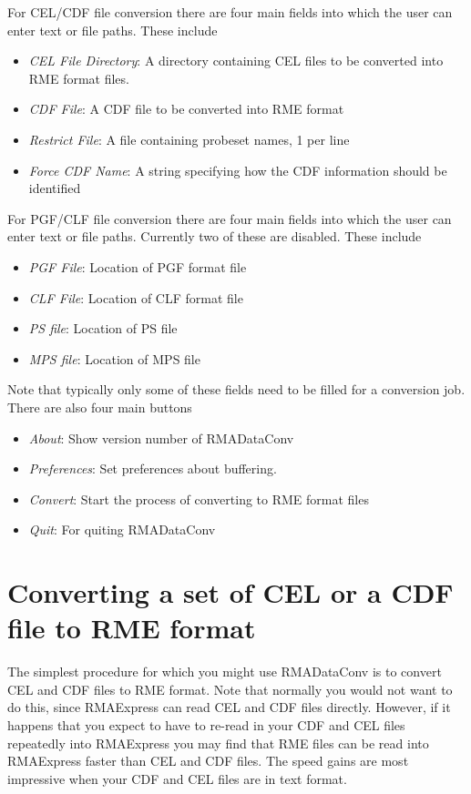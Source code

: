 \documentclass[11pt]{report}
\begin{document}
For CEL/CDF file conversion there are four main fields into which the user can enter text or file paths. These include
\begin{itemize}
\item {\it CEL File Directory}: A directory containing CEL files to be converted into RME format files.
\item {\it CDF File}: A CDF file to be converted into RME format
\item {\it Restrict File}: A file containing probeset names, 1 per line
\item {\it Force CDF Name}: A string specifying how the CDF information should be identified 
\end{itemize}

For PGF/CLF file conversion there are four main fields into which the user can enter text or file paths. Currently two of these are disabled. These include
\begin{itemize}
\item {\it PGF File}: Location of PGF format file
\item {\it CLF File}: Location of CLF format file
\item {\it PS file}: Location of PS file
\item {\it MPS file}: Location of MPS file
\end{itemize}


Note that typically only some of these fields need to be filled for a conversion job. There are also four main buttons
\begin{itemize}
\item {\it About}: Show version number of RMADataConv
\item {\it Preferences}: Set preferences about buffering.
\item {\it Convert}: Start the process of converting to RME format files
\item {\it Quit}: For quiting RMADataConv
\end{itemize}

\section{Converting a set of CEL or a CDF file to RME format}

The simplest procedure for which you might use RMADataConv is to convert CEL and CDF files to RME format. Note that normally you would not want to do this, since RMAExpress can read CEL and CDF files directly. However, if it happens that you expect to have to re-read in your CDF and CEL files repeatedly into RMAExpress you may find that RME files can be read into RMAExpress faster than CEL and CDF files. The speed gains are most impressive when your CDF and CEL files are in text format.
\end{document}
